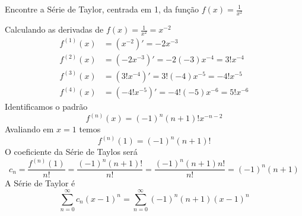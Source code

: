 \documentclass[a4paper,12pt,fleqn]{article}
\begin{document}
Encontre a Série de Taylor, centrada em 1, da função \( f(x) = \frac{1}{x^2} \)

\begin{answer}
  Calculando as derivadas de
  \( f(x) = \frac{1}{x^2} = x^{-2}\)
  \begin{align*}
    f^{(1)}(x) & = \left(x^{-2}\right)' = -2x^{-3} \\
    f^{(2)}(x) & = \left(-2x^{-3}\right)' = -2(-3)x^{-4} = 3!x^{-4} \\
    f^{(3)}(x) & = \left(3!x^{-4}\right)' = 3!(-4)x^{-5} = -4!x^{-5} \\
    f^{(4)}(x) & = \left(-4!x^{-5}\right)' = -4!(-5)x^{-6} = 5!x^{-6}
  \end{align*}
  Identificamos o padrão
  \[
    f^{(n)}(x) = (-1)^n (n+1)! x^{-n-2}
  \]
  Avaliando em $x=1$ temos
  \[
    f^{(n)}(1) = (-1)^n (n+1)!
  \]
  O coeficiente da Série de Taylos será
  \[
    c_n
    = \frac{f^{(n)}(1)}{n!}
    = \frac{(-1)^n (n+1)!}{n!}
    = \frac{(-1)^n (n+1)n!}{n!}
    = (-1)^n (n+1)
  \]
  A Série de Taylor é
  \[
    \sum_{n=0}^\infty c_n (x-1)^n
    = \sum_{n=0}^\infty (-1)^n (n+1) (x-1)^n
  \]
\end{answer}

\end{document}
